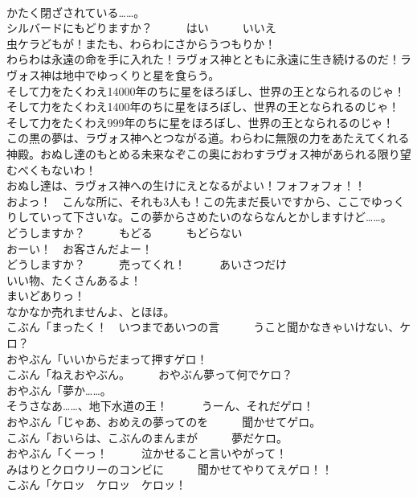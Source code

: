 \documentclass[8pt]{extreport}
\begin{document}
\begin{CJK}{UTF8}{min}
\\	かたく閉ざされている……。	
\\	シルバードにもどりますか？　　　はい　　　いいえ	
\\	虫ケラどもが！またも、わらわにさからうつもりか！	
\\	わらわは永遠の命を手に入れた！ラヴォス神とともに永遠に生き続けるのだ！ラヴォス神は地中でゆっくりと星を食らう。	
\\	そして力をたくわえ14000年のちに星をほろぼし、世界の王となられるのじゃ！	
\\	そして力をたくわえ1400年のちに星をほろぼし、世界の王となられるのじゃ！	
\\	そして力をたくわえ999年のちに星をほろぼし、世界の王となられるのじゃ！	
\\	この黒の夢は、ラヴォス神へとつながる道。わらわに無限の力をあたえてくれる神殿。おぬし達のもとめる未来なぞこの奥におわすラヴォス神があられる限り望むべくもないわ！	
\\	おぬし達は、ラヴォス神への生けにえとなるがよい！フォフォフォ！！	
\\	およっ！　こんな所に、それも3人も！この先まだ長いですから、ここでゆっくりしていって下さいな。この夢からさめたいのならなんとかしますけど……。	
\\	どうしますか？　　　もどる　　　もどらない	
\\	おーい！　お客さんだよー！	
\\	どうしますか？　　　売ってくれ！　　　あいさつだけ	
\\	いい物、たくさんあるよ！	
\\	まいどありっ！	
\\	なかなか売れませんよ、とほほ。	
\\	こぶん「まったく！　いつまであいつの言　　　うこと聞かなきゃいけない、ケロ？	
\\	おやぶん「いいからだまって押すゲロ！	
\\	こぶん「ねえおやぶん。　　　おやぶん夢って何でケロ？	
\\	おやぶん「夢か……。	
\\	そうさなあ……、地下水道の王！　　　うーん、それだゲロ！	
\\	おやぶん「じゃあ、おめえの夢ってのを　　　聞かせてゲロ。	
\\	こぶん「おいらは、こぶんのまんまが　　　夢だケロ。	
\\	おやぶん「くーっ！　　　泣かせること言いやがって！	
\\	みはりとクロウリーのコンビに　　　聞かせてやりてえゲロ！！	
\\	こぶん「ケロッ　ケロッ　ケロッ！	

\end{CJK}
\end{document}
